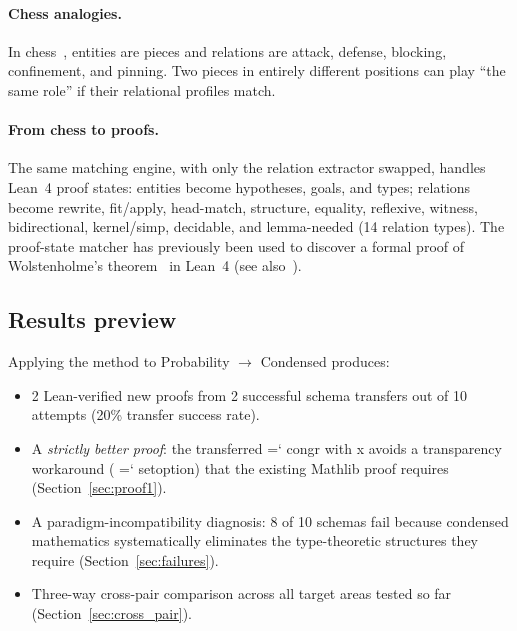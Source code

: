 \documentclass[11pt]{article}
\renewcommand{\texttt}[1]{%
  \begingroup\ttfamily\hyphenchar\font=`\-\relax
  \def\_{\textunderscore\discretionary{}{}{}}%
  #1\endgroup}
\theoremstyle{definition}
\theoremstyle{remark}
\begin{document}
\paragraph{Chess analogies.}  In chess~\cite{linhares_active_2005,
linhares_understanding_2007, linhares_questioning_2010,
linhares_entanglement_2012, linhares_what_2013,
linhares_emergence_2014}, entities are pieces and relations are attack,
defense, blocking, confinement, and pinning.  Two pieces in entirely
different positions can play ``the same role'' if their relational
profiles match.

\paragraph{From chess to proofs.}  The same matching engine, with only
the relation extractor swapped, handles Lean~4 proof states: entities
become hypotheses, goals, and types; relations become rewrite,
fit/apply, head-match, structure, equality, reflexive, witness,
bidirectional, kernel/simp, decidable, and lemma-needed (14 relation
types).  The proof-state matcher has previously been
used to discover a formal proof of Wolstenholme's
theorem~\cite{linhares_wolstenholme_2026} in Lean~4
(see also~\cite{linhares_sketch_2026}).

\subsection{Results preview}

Applying the method to Probability $\to$ Condensed produces:

\begin{itemize}
\item 2 Lean-verified new proofs from 2 successful schema transfers
  out of 10 attempts (20\% transfer success rate).
\item A \emph{strictly better proof}: the transferred
  \texttt{congr with x} avoids a transparency workaround
  (\texttt{set\_option}) that the existing Mathlib proof requires
  (Section~\ref{sec:proof1}).
\item A paradigm-incompatibility diagnosis: 8 of 10 schemas fail
  because condensed mathematics systematically eliminates the
  type-theoretic structures they require
  (Section~\ref{sec:failures}).
\item Three-way cross-pair comparison across all target areas tested
  so far (Section~\ref{sec:cross_pair}).
\end{itemize}
\end{document}
